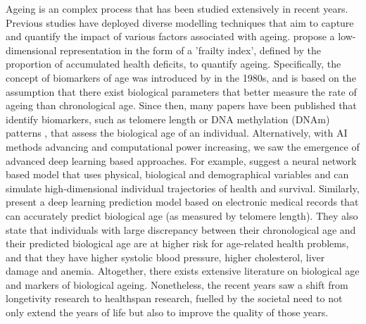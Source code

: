 Ageing is an complex process that has been studied extensively in recent years. Previous studies have deployed diverse modelling techniques that aim to capture and quantify the impact of various factors associated with ageing. \cite{mitnitski2001accumulation} propose a low-dimensional representation in the form of a 'frailty index', defined by the proportion of accumulated health deficits, to quantify ageing. Specifically, the concept of biomarkers of age was introduced by \cite{sprott2010biomarkers} in the 1980s, and is based on the assumption that there exist biological parameters that better measure the rate of ageing than chronological age. Since then, many papers have been published that identify biomarkers, such as telomere length \citep{epel2009rate} or DNA methylation (DNAm) patterns \cite{horvath2013dna}, that assess the biological age of an individual. Alternatively, with AI methods advancing and computational power increasing, we saw the emergence of advanced deep learning based approaches. For example, \cite{farrell2022interpretable} suggest a neural network based model that uses physical, biological and demographical variables and can simulate high-dimensional individual trajectories of health and survival. Similarly, \cite{wang2017predicting} present a deep learning prediction model based on electronic medical records that can accurately predict biological age (as measured by telomere length). They also state that individuals with large discrepancy between their chronological age and their predicted biological age are at higher risk for age-related health problems, and that they have higher systolic blood pressure, higher cholesterol, liver damage and anemia. Altogether, there exists extensive literature on biological age and markers of biological ageing. Nonetheless, the recent years saw a shift from longetivity research to healthspan research, fuelled by the societal need to not only extend the years of life but also to improve the quality of those years. %


